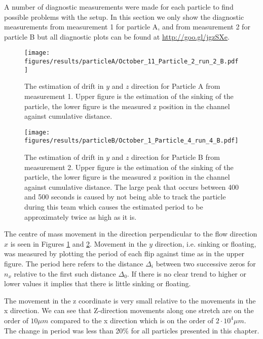 
A number of diagnostic measurements were made for each particle to find possible problems with the setup. In this section we only show the diagnostic measurements from measurement 1 for particle A, and from measurement 2 for particle B but all diagnostic plots can be found at \url{http://goo.gl/jgzSXe}.


\begin{figure}[H]
\begin{center}
\texttt{[image: figures/results/particleA/October\_11\_Particle\_2\_run\_2\_B.pdf]}
\end{center}
\caption{The estimation of drift in $y$ and $z$ direction for Particle A from measurement 1. Upper figure is the estimation of the sinking of the particle, the lower figure is the measured z position in the channel against cumulative distance. }
\label{fig:particleAsink}
\end{figure}

\begin{figure}[H]
\centering
\texttt{[image: figures/results/particleB/October\_1\_Particle\_4\_run\_4\_B.pdf]}	
\caption{The estimation of drift in $y$ and $z$ direction for Particle B from measurement 2. Upper figure is the estimation of the sinking of the particle, the lower figure is the measured z position in the channel against cumulative distance. The large peak that occurs between 400 and 500 seconds is caused by not being able to track the particle during this team which causes the estimated period to be approximately twice as high as it is.}
\label{fig:particleB2sinking}
\end{figure}



The centre of mass movement in the direction perpendicular to the flow direction $x$ is seen in Figures \ref{fig:particleAsink} and \ref{fig:particleB2sinking}. Movement in the $y$ direction, i.e. sinking or floating, was measured by plotting the period of each flip against time as in the upper figure. The period here refers to the distance $\Delta_i$ between two successive zeros for $n_x$ relative to the first such distance $\Delta_0$. If there is no clear trend to higher or lower values it implies that there is little sinking or floating. 

The movement in the z coordinate is very small relative to the movements in the x direction. We can see that Z-direction movements along one stretch are on the order of $10\mu m$ compared to the x direction which is on the order of $2\cdot 10^4 \mu m$. The change in period was less than 20\% for all particles presented in this chapter.

